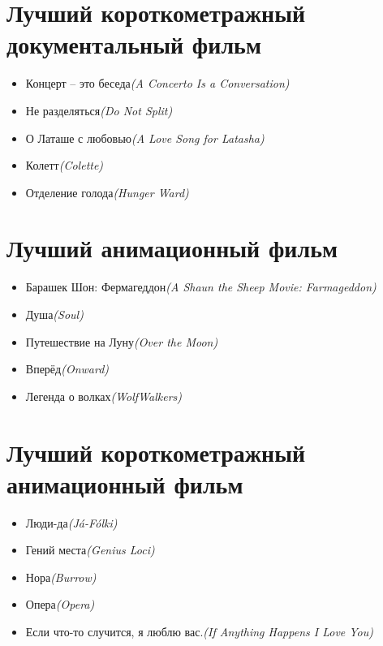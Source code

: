 \documentclass[a4paper,10pt]{article}
\begin{document}
\begin{multicols}{2}
\section{Лучший короткометражный документальный фильм}

\begin{itemize}
	\item Концерт – это беседа\newline\textit{(A Concerto Is a Conversation)}
	\item Не разделяться\newline\textit{(Do Not Split)}
	\item О Латаше с любовью\newline\textit{(A Love Song for Latasha)}
	\item Колетт\newline\textit{(Colette)}
	\item Отделение голода\newline\textit{(Hunger Ward)}
\end{itemize}

\section{Лучший анимационный фильм}

\begin{itemize}
	\item Барашек Шон: Фермагеддон\newline\textit{(A Shaun the Sheep Movie: Farmageddon)}
	\item Душа\newline\textit{(Soul)}
	\item Путешествие на Луну\newline\textit{(Over the Moon)}
	\item Вперёд\newline\textit{(Onward)}
	\item Легенда о волках\newline\textit{(WolfWalkers)}
\end{itemize}

\section{Лучший короткометражный анимационный фильм}

\begin{itemize}
	\item Люди-да\newline\textit{(Já-Fólki)}
	\item Гений места\newline\textit{(Genius Loci)}
	\item Нора\newline\textit{(Burrow)}
	\item Опера\newline\textit{(Opera)}
	\item Если что-то случится, я люблю вас.\newline\textit{(If Anything Happens I Love You)}
\end{itemize}


\end{multicols}
\end{document}
